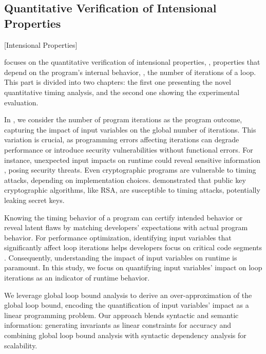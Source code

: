 \subsection{Quantitative Verification of Intensional Properties}[Intensional Properties]


 focuses on the quantitative verification of intensional properties, \ie, properties that depend on the program's internal behavior, \eg, the number of iterations of a loop.
This part is divided into two chapters: the first one presenting the novel quantitative timing analysis, and the second one showing the experimental evaluation.

In , we consider the number of program iterations as the program outcome, capturing the impact of input variables on the global number of iterations.
This variation is crucial, as programming errors affecting iterations can degrade performance or introduce security vulnerabilities without functional errors.
For instance, unexpected input impacts on runtime could reveal sensitive information , posing security threats.
Even cryptographic programs are vulnerable to timing attacks, depending on implementation choices.
 demonstrated that public key cryptographic algorithms, like RSA, are susceptible to timing attacks, potentially leaking secret keys.

Knowing the timing behavior of a program can certify intended behavior or reveal latent flaws by matching developers' expectations with actual program behavior.
For performance optimization, identifying input variables that significantly affect loop iterations helps developers focus on critical code segments .
Consequently, understanding the impact of input variables on runtime is paramount.
In this study, we focus on quantifying input variables' impact on loop iterations as an indicator of runtime behavior.

We leverage global loop bound analysis to derive an over-approximation of the global loop bound, encoding the quantification of input variables' impact as a linear programming problem.
Our approach blends syntactic and semantic information: generating invariants as linear constraints for accuracy and combining global loop bound analysis with syntactic dependency analysis  for scalability.

